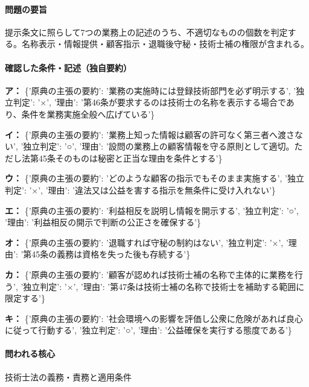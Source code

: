 \paragraph{問題の要旨} 提示条文に照らして7つの業務上の記述のうち、不適切なものの個数を判定する。名称表示・情報提供・顧客指示・退職後守秘・技術士補の権限が含まれる。

\paragraph{確認した条件・記述（独自要約）}\mbox{}\par

\noindent\textbf{ア：} \{'原典の主張の要約': '業務の実施時には登録技術部門を必ず明示する', '独立判定': '×', '理由': '第46条が要求するのは技術士の名称を表示する場合であり、条件を業務実施全般へ広げている'\}\par

\noindent\textbf{イ：} \{'原典の主張の要約': '業務上知った情報は顧客の許可なく第三者へ渡さない', '独立判定': '○', '理由': '設問の業務上の顧客情報を守る原則として適切。ただし法第45条そのものは秘密と正当な理由を条件とする'\}\par

\noindent\textbf{ウ：} \{'原典の主張の要約': 'どのような顧客の指示でもそのまま実施する', '独立判定': '×', '理由': '違法又は公益を害する指示を無条件に受け入れない'\}\par

\noindent\textbf{エ：} \{'原典の主張の要約': '利益相反を説明し情報を開示する', '独立判定': '○', '理由': '利益相反の開示で判断の公正さを確保する'\}\par

\noindent\textbf{オ：} \{'原典の主張の要約': '退職すれば守秘の制約はない', '独立判定': '×', '理由': '第45条の義務は資格を失った後も存続する'\}\par

\noindent\textbf{カ：} \{'原典の主張の要約': '顧客が認めれば技術士補の名称で主体的に業務を行う', '独立判定': '×', '理由': '第47条は技術士補の名称で技術士を補助する範囲に限定する'\}\par

\noindent\textbf{キ：} \{'原典の主張の要約': '社会環境への影響を評価し公衆に危険があれば良心に従って行動する', '独立判定': '○', '理由': '公益確保を実行する態度である'\}\par

\paragraph{問われる核心} 技術士法の義務・責務と適用条件

